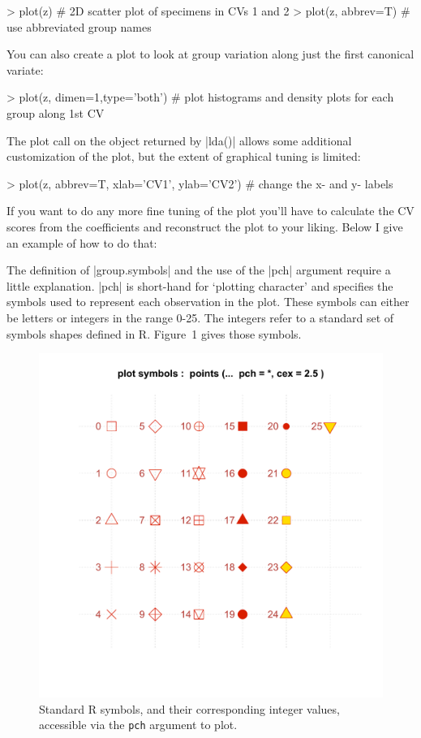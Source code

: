 \begin{R}
> plot(z) # 2D scatter plot of specimens in CVs 1 and 2
> plot(z, abbrev=T) # use abbreviated group names
\end{R}

You can also create a plot to look at group variation along just the first canonical variate:

\begin{R}
> plot(z, dimen=1,type='both') # plot histograms and density plots for each group along 1st CV
\end{R}


The plot call on the object returned by |lda()| allows some additional customization of the plot, but the extent of graphical tuning is limited:

\begin{R}
> plot(z, abbrev=T, xlab='CV1', ylab='CV2') # change the x- and y- labels
\end{R}

If you want to do any more fine tuning of the plot you'll have to calculate the CV scores from the coefficients and reconstruct the plot to your liking. Below I give an example of how to do that:


The definition of |group.symbols| and the use of the |pch| argument require a little explanation. |pch| is short-hand for `plotting  character' and specifies the symbols used to represent each observation in the plot.  These symbols can either be letters or integers in the range 0-25. The integers refer to a standard set of symbols shapes defined in R. Figure~1 gives those symbols.

\begin{figure}
\begin{center}

\includegraphics[width=0.5\columnwidth]{./figures/hands-on7/pch-symbols}

\end{center}
\caption{Standard R symbols, and their corresponding integer values, accessible via the \texttt{pch} argument to plot.}
\end{figure}

